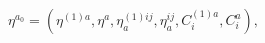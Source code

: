 \begin{equation}
\eta ^{a_{0}}=\left( \eta ^{(1)a},\eta ^{a},\eta _{a}^{(1)ij},\eta
_{a}^{ij},C_{i}^{(1)a},C_{i}^{a}\right) ,  \label{f17}
\end{equation}

